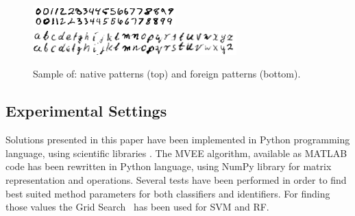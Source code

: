 \documentclass{llncs}
\begin{document}
\begin{figure}[!tbp]
\vspace{-6pt}
  \centering
  \includegraphics[width=0.49\textwidth]{_Figures/natives}\\
  \includegraphics[width=0.7\textwidth]{_Figures/foreigns}
\vspace{-6pt}
  \caption{Sample of: native patterns (top) and foreign patterns (bottom).}
\label{fig:nativeforeignpatterns}
\vspace{-12pt}
\end{figure}

\vspace{-6pt}
\subsection{Experimental Settings}
\vspace{-3pt}

Solutions presented in this paper have been implemented in Python programming language, using scientific libraries \cite{MatLab,NumPy,Scikit}. The MVEE algorithm, available as MATLAB code  %
has been rewritten in Python language, using NumPy library for matrix representation and operations. Several tests have been performed in order to find best suited method parameters for both classifiers and identifiers. For finding those values the Grid Search~\cite{Scikit} %
has been used for SVM and RF. %

\vspace{-9pt}
\end{document}
